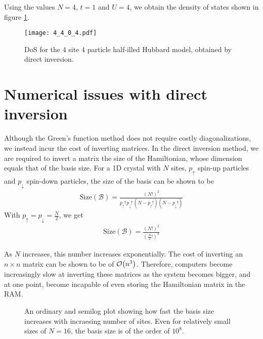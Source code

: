 		Using the values $ N = 4 $, $ t = 1 $ and $ U = 4 $, we obtain the density of states shown in figure \ref{fig:4_4_0_4}.
		\begin{figure}[h!]
			\centering
			\texttt{[image: 4\_4\_0\_4.pdf]}
			\caption{DoS for the 4 site 4 particle half-illed Hubbard model, obtained by direct inversion.}
			\label{fig:4_4_0_4}
		\end{figure}

\section{Numerical issues with direct inversion}
	Although the Green's function method does not require costly diagonalizations, we instead incur the cost of inverting matrices. In the direct inversion method, we are required to invert a matrix the size of the Hamiltonian, whose dimension equals that of the basis size. For a 1D crystal with $ N $ sites, $ p_{\uparrow} $ spin-up particles and $ p_{\downarrow} $ spin-down particles, the size of the basis can be shown to be
	\begin{align}
		\mathrm{Size}\left( \mathcal{B} \right) =
		\frac{\left( N! \right)^{2} }{p_{\uparrow}!\,p_{\downarrow}!\,\left( N-p_{\uparrow}!\right) \left( N-p_{\downarrow}!\right) }
	\end{align}
	With $ p_{\uparrow} = p_{\downarrow} = \tfrac{N}{2} $, we get
	\begin{align}
		\mathrm{Size}\left( \mathcal{B} \right) =
		\frac{\left( N! \right)^{2} }{\left( \tfrac{N}{2}! \right)^{4}}
	\end{align}
	
	As $ N $ increases, this number increases exponentially. The cost of inverting an $ n \times n $ matrix can be shown to be of $ \order{n^3} $. Therefore, computers become increasingly slow at inverting these matrices as the system becomes bigger, and at one point, become incapable of even storing the Hamiltonian matrix in the RAM.
	
	\begin{figure}[h!]
		\centering
		\caption{An ordinary and semilog plot showing how fast the basis size increases with incraesing number of sites. Even for relatively small sizes of $ N = 16 $, the basis size is of the order of $ 10^{8} $.}
	\end{figure}
	
	

	
	
	



